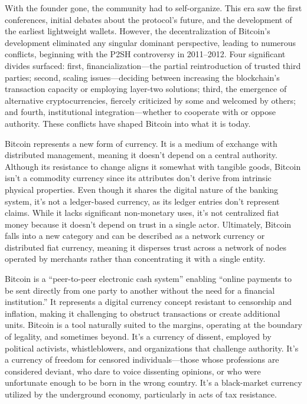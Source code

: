 \documentclass[
  a5paper,
  smalldemyvopaper,10pt,twoside,onecolumn,openright,extrafontsizes,hidelinks]{memoir}
\begin{document}
With the founder gone, the community had to self-organize. This era saw
the first conferences, initial debates about the protocol's future, and
the development of the earliest lightweight wallets. However, the
decentralization of Bitcoin's development eliminated any singular
dominant perspective, leading to numerous conflicts, beginning with the
P2SH controversy in 2011--2012. Four significant divides surfaced:
first, financialization---the partial reintroduction of trusted third
parties; second, scaling issues---deciding between increasing the
blockchain's transaction capacity or employing layer-two solutions;
third, the emergence of alternative cryptocurrencies, fiercely
criticized by some and welcomed by others; and fourth, institutional
integration---whether to cooperate with or oppose authority. These
conflicts have shaped Bitcoin into what it is today.

Bitcoin represents a new form of currency. It is a medium of exchange
with distributed management, meaning it doesn't depend on a central
authority. Although its resistance to change aligns it somewhat with
tangible goods, Bitcoin isn't a commodity currency since its attributes
don't derive from intrinsic physical properties. Even though it shares
the digital nature of the banking system, it's not a ledger-based
currency, as its ledger entries don't represent claims. While it lacks
significant non-monetary uses, it's not centralized fiat money because
it doesn't depend on trust in a single actor. Ultimately, Bitcoin falls
into a new category and can be described as a network currency or
distributed fiat currency, meaning it disperses trust across a network
of nodes operated by merchants rather than concentrating it with a
single entity.

Bitcoin is a ``peer-to-peer electronic cash system'' enabling ``online
payments to be sent directly from one party to another without the need
for a financial institution.'' It represents a digital currency concept
resistant to censorship and inflation, making it challenging to obstruct
transactions or create additional units. Bitcoin is a tool naturally
suited to the margins, operating at the boundary of legality, and
sometimes beyond. It's a currency of dissent, employed by political
activists, whistleblowers, and organizations that challenge authority.
It's a currency of freedom for censored individuals---those whose
professions are considered deviant, who dare to voice dissenting
opinions, or who were unfortunate enough to be born in the wrong
country. It's a black-market currency utilized by the underground
economy, particularly in acts of tax resistance.
\end{document}
